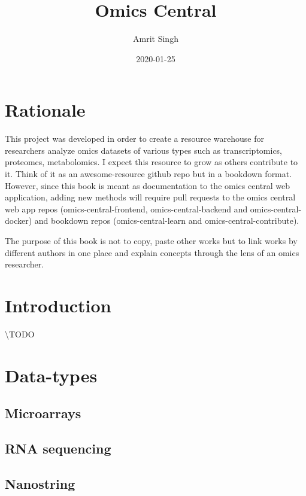 \documentclass[]{book}
\title{Omics Central}
\author{Amrit Singh}
\date{2020-01-25}
\begin{document}
\maketitle

{
\setcounter{tocdepth}{1}
\tableofcontents
}
\chapter{Rationale}\label{rationale}

This project was developed in order to create a resource warehouse for
researchers analyze omics datasets of various types such as
transcriptomics, proteomcs, metabolomics. I expect this resource to grow
as others contribute to it. Think of it as an awesome-resource github
repo but in a bookdown format. However, since this book is meant as
documentation to the omics central web application, adding new methods
will require pull requests to the omics central web app repos
(omics-central-frontend, omics-central-backend and omics-central-docker)
and bookdown repos (omics-central-learn and omics-central-contribute).

The purpose of this book is not to copy, paste other works but to link
works by different authors in one place and explain concepts through the
lens of an omics researcher.

\chapter{Introduction}\label{intro}

\textbackslash{}TODO

\chapter{Data-types}\label{data-types}

\section{Microarrays}\label{microarrays}

\section{RNA sequencing}\label{rna-sequencing}

\section{Nanostring}\label{nanostring}
\end{document}
